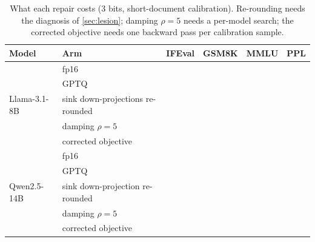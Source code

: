 \begin{table}[t]
\caption{What each repair costs (3 bits, short-document calibration). Re-rounding needs the diagnosis of \cref{sec:lesion}; damping $\rho=5$ needs a per-model search; the corrected objective needs one backward pass per calibration sample.}
\label{tab:downstream}
\begin{center}
\small
\begin{tabular}{llcccc}
\toprule
Model & Arm & IFEval & GSM8K & MMLU & PPL \\
\midrule
\multirow{5}{*}{Llama-3.1-8B}
 & fp16                              & \LfpIF{}       & \LfpGSM{}       & \LfpMMLU{}       & \LfpPPL{} \\
 & GPTQ                              & \LgptqIF{}     & \LgptqGSM{}     & \LgptqMMLU{}     & \LgptqPPL{} \\
 & sink down-projections re-rounded  & \LzeroBitIF{}  & \LzeroBitGSM{}  & \LzeroBitMMLU{}  & \LzeroBitPPL{} \\
 & damping $\rho=5$                  & \LdampFiveIF{} & \LdampFiveGSM{} & \LdampFiveMMLU{} & \LdampFivePPL{} \\
 & corrected objective               & \LcorrIF{}     & \LcorrGSM{}     & \LcorrMMLU{}     & \LcorrPPL{} \\
\midrule
\multirow{5}{*}{Qwen2.5-14B}
 & fp16                              & \QfpIF{}       & \QfpGSM{}       & \QfpMMLU{}       & \QfpPPL{} \\
 & GPTQ                              & \QgptqIF{}     & \QgptqGSM{}     & \QgptqMMLU{}     & \QgptqPPL{} \\
 & sink down-projection re-rounded   & \QoneMatrixIF{} & \QzeroBitGSM{} & \QzeroBitMMLU{}  & \QzeroBitPPL{} \\
 & damping $\rho=5$                  & \QdampFiveIF{} & \QdampFiveGSM{} & \QdampFiveMMLU{} & \QdampFivePPL{} \\
 & corrected objective               & \QcorrIF{}     & \QcorrGSM{}     & \QcorrMMLU{}     & \QcorrPPL{} \\
\bottomrule
\end{tabular}
\end{center}
\end{table}
